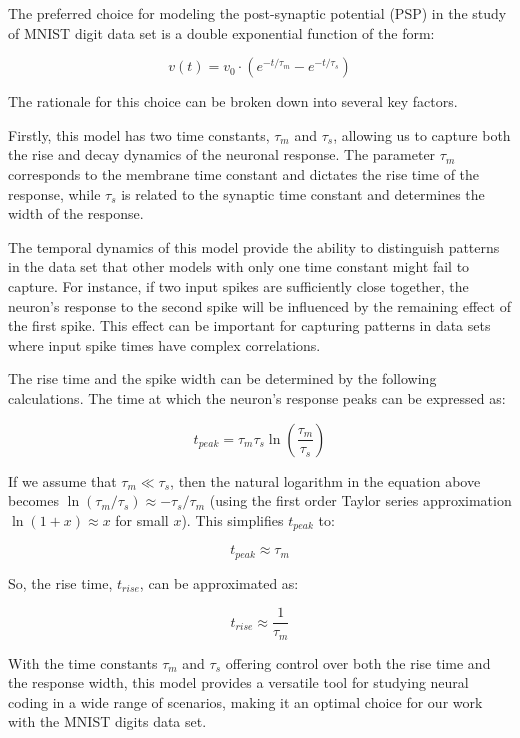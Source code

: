 The preferred choice for modeling the post-synaptic potential (PSP) in the study of MNIST digit data set is a double exponential function of the form:

\begin{equation}
    v(t) = v_0 \cdot (e^{-t/\tau_m} - e^{-t/\tau_s})
\end{equation}

The rationale for this choice can be broken down into several key factors. 

Firstly, this model has two time constants, $\tau_m$ and $\tau_s$, allowing us to capture both the rise and decay dynamics of the neuronal response. The parameter $\tau_m$ corresponds to the membrane time constant and dictates the rise time of the response, while $\tau_s$ is related to the synaptic time constant and determines the width of the response.

The temporal dynamics of this model provide the ability to distinguish patterns in the data set that other models with only one time constant might fail to capture. For instance, if two input spikes are sufficiently close together, the neuron's response to the second spike will be influenced by the remaining effect of the first spike. This effect can be important for capturing patterns in data sets where input spike times have complex correlations.

The rise time and the spike width can be determined by the following calculations. The time at which the neuron's response peaks can be expressed as:

\begin{equation}
t_{peak} = \tau_m \tau_s \ln\left(\frac{\tau_m}{\tau_s}\right)
\end{equation}

If we assume that $\tau_m \ll \tau_s$, then the natural logarithm in the equation above becomes $\ln(\tau_m/\tau_s) \approx -\tau_s/\tau_m$ (using the first order Taylor series approximation $\ln(1+x) \approx x$ for small $x$). This simplifies $t_{peak}$ to:

\begin{equation}
t_{peak} \approx \tau_m
\end{equation}

So, the rise time, $t_{rise}$, can be approximated as:

\begin{equation}
t_{rise} \approx \frac{1}{\tau_m}
\end{equation}

With the time constants $\tau_m$ and $\tau_s$ offering control over both the rise time and the response width, this model provides a versatile tool for studying neural coding in a wide range of scenarios, making it an optimal choice for our work with the MNIST digits data set.







